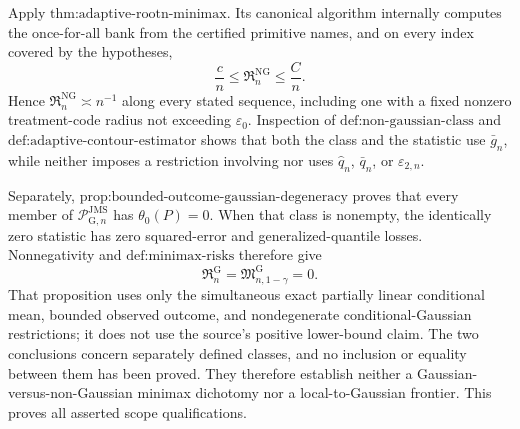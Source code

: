 Apply \(\text{thm:adaptive-rootn-minimax}\).  Its canonical algorithm internally computes the once-for-all bank from the certified primitive names, and on every index covered by the hypotheses,
\[
 \frac cn\le\mathfrak R_n^{\mathrm{NG}}\le\frac Cn.
\]
Hence \(\mathfrak R_n^{\mathrm{NG}}\asymp n^{-1}\) along every stated sequence, including one with a fixed nonzero treatment-code radius not exceeding \(\varepsilon_0\).  Inspection of \(\text{def:non-gaussian-class}\) and \(\text{def:adaptive-contour-estimator}\) shows that both the class and the statistic use \(\bar g_n\), while neither imposes a restriction involving nor uses \(\widehat q_n\), \(\bar q_n\), or \(\varepsilon_{2,n}\).

Separately, \(\text{prop:bounded-outcome-gaussian-degeneracy}\) proves that every member of \(\mathcal P_{\mathrm G,n}^{\mathrm{JMS}}\) has \(\theta_0(P)=0\).  When that class is nonempty, the identically zero statistic has zero squared-error and generalized-quantile losses.  Nonnegativity and \(\text{def:minimax-risks}\) therefore give
\[
 \mathfrak R_n^{\mathrm G}
 =\mathfrak M_{n,1-\gamma}^{\mathrm G}=0.
\]
That proposition uses only the simultaneous exact partially linear conditional mean, bounded observed outcome, and nondegenerate conditional-Gaussian restrictions; it does not use the source's positive lower-bound claim.  The two conclusions concern separately defined classes, and no inclusion or equality between them has been proved.  They therefore establish neither a Gaussian-versus-non-Gaussian minimax dichotomy nor a local-to-Gaussian frontier.  This proves all asserted scope qualifications.